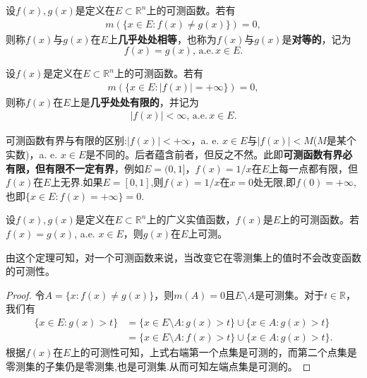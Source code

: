 \documentclass[../../main.tex]{subfiles}%
\begin{document}
\begin{definition}
设$f(x), g(x)$是定义在$E \subset \mathbb{R}^n$上的可测函数。若有
\begin{align*}
m(\{x \in E: f(x) \neq g(x)\}) = 0,
\end{align*}
则称$f(x)$与$g(x)$在$E$上\textbf{几乎处处相等}，也称为$f(x)$与$g(x)$是\textbf{对等的}，记为$$f(x) = g(x),\,\mathrm{a}.\mathrm{e}.\,x \in E.$$

设$f(x)$是定义在$E \subset \mathbb{R}^n$上的可测函数。若有
\begin{align*}
m(\{x \in E: |f(x)| = +\infty\}) = 0,
\end{align*}
则称$f(x)$在$E$上是\textbf{几乎处处有限的}，并记为
\begin{align*}
|f(x)| < \infty,\,\mathrm{a}.\mathrm{e}.\,x \in E.
\end{align*}
\end{definition}
\begin{remark}
可测函数有界与有限的区别:$|f(x)| < +\infty$，a. e. $x \in E$与$|f(x)| < M$($M$是某个实数)，a. e. $x \in E$是不同的。后者蕴含前者，但反之不然。此即\textbf{可测函数有界必有限，但有限不一定有界}，例如\(E = (0, 1]\)，\(f(x) = 1/x\)在\(E\)上每一点都有限，但\(f(x)\)在\(E\)上无界.如果$E=[0,1]$,则\(f(x) = 1/x\)在$x=0$处无限,即$f(0)=+\infty$,也即$\{x\in E:f(x)=+\infty\}={0}.$
\end{remark}

\begin{theorem}
设$f(x),g(x)$是定义在$E \subset \mathbb{R}^n$上的广义实值函数，$f(x)$是$E$上的可测函数。若$f(x) = g(x)$, a.e. $x \in E$，则$g(x)$在$E$上可测。
\end{theorem}
\begin{remark}
由这个定理可知，对一个可测函数来说，当改变它在零测集上的值时不会改变函数的可测性。 
\end{remark}
\begin{proof}

令$A = \{x: f(x) \neq g(x)\}$，则$m(A) = 0$且$E \setminus A$是可测集。对于$t \in \mathbb{R}$，我们有
\begin{align*}
\{x \in E: g(x) > t\} 
&= \{x \in E \setminus A: g(x) > t\} \cup \{x \in A: g(x) > t\} \\
&= \{x \in E \setminus A: f(x) > t\} \cup \{x \in A: g(x) > t\}.
\end{align*}
根据$f(x)$在$E$上的可测性可知，上式右端第一个点集是可测的，而第二个点集是零测集的子集仍是零测集,也是可测集.从而可知左端点集是可测的。

\end{proof}
\end{document}

